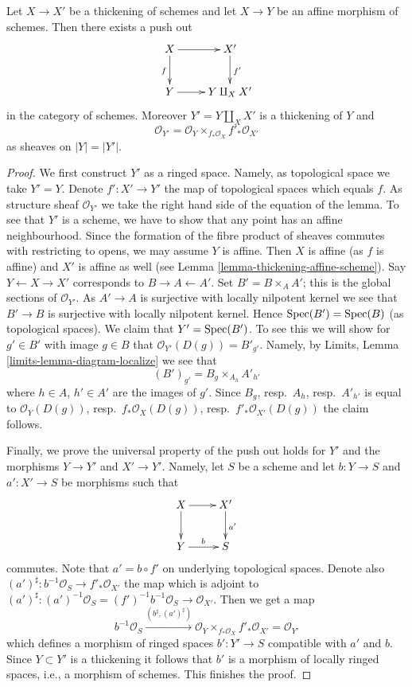 \begin{lemma}
\label{lemma-pushout-along-thickening}
Let $X \to X'$ be a thickening of schemes and let $X \to Y$ be an affine
morphism of schemes. Then there exists a push out
$$
\xymatrix{
X \ar[r] \ar[d]_f
&
X' \ar[d]^{f'}
\\
Y \ar[r]
&
Y \amalg_X X'
}
$$
in the category of schemes. Moreover $Y' = Y \amalg_X X'$ is a
thickening of $Y$ and
$$
\mathcal{O}_{Y'} = \mathcal{O}_Y \times_{f_*\mathcal{O}_X} f'_*\mathcal{O}_{X'}
$$
as sheaves on $|Y| = |Y'|$.
\end{lemma}

\begin{proof}
We first construct $Y'$ as a ringed space. Namely, as topological
space we take $Y' = Y$. Denote $f' : X' \to Y'$ the map of topological
spaces which equals $f$. As structure sheaf $\mathcal{O}_{Y'}$ we take
the right hand side of the equation of the lemma. To see that
$Y'$ is a scheme, we have to show that any point has an affine
neighbourhood. Since the formation of the fibre product of sheaves
commutes with restricting to opens, we may assume $Y$ is affine.
Then $X$ is affine (as $f$ is affine) and $X'$ is affine as well
(see Lemma \ref{lemma-thickening-affine-scheme}).
Say $Y \leftarrow X \rightarrow X'$ corresponds
to $B \rightarrow A \leftarrow A'$. Set $B' = B \times_A A'$; this
is the global sections of $\mathcal{O}_{Y'}$. As $A' \to A$ is surjective
with locally nilpotent kernel we see that $B' \to B$ is surjective
with locally nilpotent kernel. Hence $\mathop{\rm Spec}(B') = \mathop{\rm Spec}(B)$ (as
topological spaces). We claim that $Y' = \mathop{\rm Spec}(B')$. To see this
we will show for $g' \in B'$ with image $g \in B$ that
$\mathcal{O}_{Y'}(D(g)) = B'_{g'}$. Namely, by
Limits, Lemma \ref{limits-lemma-diagram-localize} we see that
$$
(B')_{g'} = B_g \times_{A_h} A'_{h'}
$$
where $h \in A$, $h' \in A'$ are the images of $g'$. Since
$B_g$, resp.\ $A_h$, resp.\ $A'_{h'}$ is equal to $\mathcal{O}_Y(D(g))$,
resp.\ $f_*\mathcal{O}_X(D(g))$, resp.\ $f'_*\mathcal{O}_{X'}(D(g))$ the
claim follows.

\medskip\noindent
Finally, we prove the universal property of the push out holds for
$Y'$ and the morphisms $Y \to Y'$ and $X' \to Y'$. Namely, let $S$ be
a scheme and let $b : Y \to S$ and $a' : X' \to S$ be morphisms such that
$$
\xymatrix{
X \ar[r] \ar[d]
&
X' \ar[d]^{a'}
\\
Y \ar[r]^b
&
S
}
$$
commutes. Note that $a' = b \circ f'$ on underlying topological spaces.
Denote also $(a')^\sharp : b^{-1}\mathcal{O}_S \to f'_*\mathcal{O}_{X'}$
the map which is adjoint to $(a')^\sharp :
(a')^{-1}\mathcal{O}_S = (f')^{-1} b^{-1}\mathcal{O}_S \to \mathcal{O}_{X'}$.
Then we get a map
$$
b^{-1}\mathcal{O}_S
\xrightarrow{(b^\sharp, (a')^\sharp)}
\mathcal{O}_Y \times_{f_*\mathcal{O}_X} f'_*\mathcal{O}_{X'}
=
\mathcal{O}_{Y'}
$$
which defines a morphism of ringed spaces $b' : Y' \to S$ compatible
with $a'$ and $b$. Since $Y \subset Y'$ is a thickening it follows that
$b'$ is a morphism of locally ringed spaces, i.e., a morphism of schemes.
This finishes the proof.
\end{proof}

